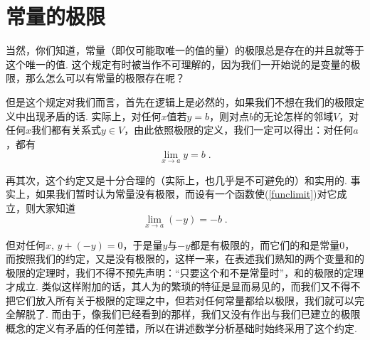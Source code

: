 \documentclass[color=cyan,mathpazo,titlestyle=hang]{elegantbook_mac}
\begin{document}
\begin{figure}[h]
\begin{minipage}[b]{5cm}
\caption{}\label{m6}
\end{minipage}
\hfill
\begin{minipage}[b]{5cm}
\caption{}\label{m7}
\end{minipage}
\end{figure}

\section{常量的极限}

当然，你们知道，常量（即仅可能取唯一的值的量）的极限总是存在的并且就等于这个唯一的值. 这个规定有时被当作不可理解的，因为我们一开始说的是变量的极限，那么怎么可以有常量的极限存在呢？

但是这个规定对我们而言，首先在逻辑上是必然的，如果我们不想在我们的极限定义中出现矛盾的话. 实际上，对任何$x$值若$y=b$，则对点$b$的无论怎样的邻域$V$，对任何$x$我们都有关系式$y\in V$，由此依照极限的定义，我们一定可以得出：对任何$a$，都有
\begin{equation}\label{funclimit}
	\lim_{x\to a} y=b\; .
\end{equation}

再其次，这个约定又是十分合理的（实际上，也几乎是不可避免的）和实用的. 事实上，如果我们暂时认为常量没有极限，而设有一个函数使(\ref{funclimit})对它成立，则大家知道
$$
\lim_{x\to a}(-y)=-b\; .
$$

但对任何$x$, $y+(-y)=0$，于是量$y$与$-y$都是有极限的，而它们的和是常量$0$，而按照我们的约定，又是没有极限的，这样一来，在表述我们熟知的两个变量和的极限的定理时，我们不得不预先声明：``只要这个和不是常量时''，和的极限的定理才成立. 类似这样附加的话，其人为的繁琐的特征是显而易见的，而我们又不得不把它们放入所有关于极限的定理之中，但若对任何常量都给以极限，我们就可以完全解脱了. 而由于，像我们已经看到的那样，我们又没有作出与我们已建立的极限概念的定义有矛盾的任何差错，所以在讲述数学分析基础时始终采用了这个约定. 
\end{document}
